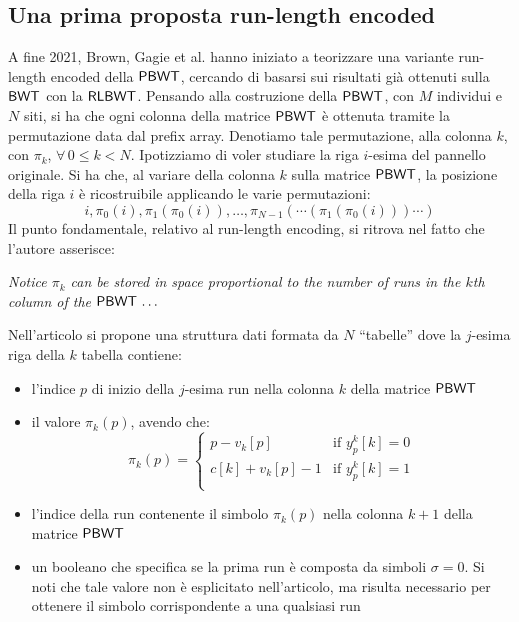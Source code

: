 \subsection{Una prima proposta run-length encoded}
\label{subsectravis}
A fine 2021, Brown, Gagie et al. \cite{tricks} hanno iniziato a teorizzare una variante
run-length encoded della $\mbox{\rm {\sf PBWT}}$, cercando di basarsi sui risultati
già ottenuti sulla $\mbox{\rm {\sf BWT}}$ con la $\mbox{\rm {\sf RLBWT}}$.
Pensando alla costruzione della $\mbox{\rm {\sf PBWT}}$, con $M$ individui e $N$ siti, si
ha che ogni colonna della 
matrice $\mbox{\rm {\sf PBWT}}$ è ottenuta tramite la permutazione data dal prefix
  array. Denotiamo tale permutazione, alla colonna $k$, con $\pi_k$, $\forall\,
0\leq k<N$. 
Ipotizziamo di voler studiare la riga $i$-esima del pannello originale. Si
ha che, al variare della colonna $k$ sulla matrice $\mbox{\rm {\sf PBWT}}$, la posizione
della riga $i$ è ricostruibile applicando le varie permutazioni:
\begin{equation}
  \label{eq:pbwttrick}
  i, \pi_0(i), \pi_1(\pi_0(i)),\ldots,
  \pi_{N-1}(\cdots(\pi_1(\pi_0(i)))\cdots)
\end{equation}
Il punto fondamentale, relativo al run-length encoding, si ritrova nel fatto che
l'autore asserisce: 
\begin{center}
  \textit{Notice $\pi_k$ can be stored in space proportional to the number of
    runs in the $k$th column of the $\mbox{\rm {\sf PBWT}}\,\ldots$} 
\end{center}
Nell'articolo si propone una struttura dati formata da $N$ ``tabelle''
dove la $j$-esima riga della $k$ tabella contiene: 
\begin{itemize}
  \item l'indice $p$ di inizio della $j$-esima run nella colonna $k$ della
   matrice $\mbox{\rm {\sf PBWT}}$
  \item il valore $\pi_k(p)$, avendo che:
  \begin{equation}
    \label{eq:pbwttrick1}
    \pi_k(p)=
    \begin{cases}
      p-v_k[p]&\mbox{if } y_p^k[k]=0\\
      c[k]+v_k[p]-1&\mbox{if } y_p^k[k]=1\\
    \end{cases}
  \end{equation}
  \item l'indice della run contenente il simbolo $\pi_k(p)$ nella colonna $k+1$
  della matrice $\mbox{\rm {\sf PBWT}}$
  \item un booleano che specifica se la prima run è composta da simboli
  $\sigma=0$. Si noti che tale valore non è esplicitato nell'articolo, ma
  risulta necessario per ottenere il simbolo corrispondente a una qualsiasi run
\end{itemize}
